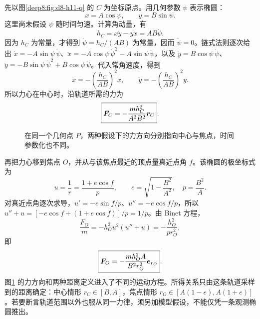 \begin{solution}
先以图\ref{deep8:fig:d8-h11-q} 的 $C$ 为坐标原点。用几何参数 $\psi$ 表示椭圆：
\[
 x=A\cos\psi,\qquad y=B\sin\psi.
\]
这里尚未假设 $\psi$ 随时间匀速。计算角动量，有
\[
 h_C=x\dot y-y\dot x=AB\dot\psi.
\]
因为 $h_C$ 为常量，才得到 $\dot\psi=h_C/(AB)$ 为常量，因而 $\ddot\psi=0$。链式法则逐次给出 $\dot x=-A\sin\psi\,\dot\psi$、$\ddot x=-A\cos\psi\,\dot\psi^2-A\sin\psi\,\ddot\psi$，以及 $\dot y=B\cos\psi\,\dot\psi$、$\ddot y=-B\sin\psi\,\dot\psi^2+B\cos\psi\,\ddot\psi$。代入常角速度，得到
\[
 \ddot x=-\left(\frac{h_C}{AB}\right)^2x,\qquad
 \ddot y=-\left(\frac{h_C}{AB}\right)^2y.
\]
所以力心在中心时，沿轨道所需的力为
\begin{equation}
 \boxed{\bm{F}_C=-\frac{mh_C^2}{A^2B^2}\bm{r}_C}.
\end{equation}
\begin{figure}[H]\centering
{}
\caption{在同一个几何点 $P$，两种假设下的力方向分别指向中心与焦点，时间参数化也不同。}\label{deep8:fig:d8-h11-s}
\end{figure}
再把力心移到焦点 $O$，并从与该焦点最近的顶点量真近点角 $f$。该椭圆的极坐标式为
\[
 u=\frac1r=\frac{1+e\cos f}{p},\qquad
 e=\sqrt{1-\frac{B^2}{A^2}},\quad p=\frac{B^2}A.
\]
对真近点角逐次求导，$u'=-e\sin f/p$、$u''=-e\cos f/p$，所以 $u''+u=[-e\cos f+(1+e\cos f)]/p=1/p$。由 Binet 方程，
\[
 \frac{F_O}m=-h_O^2u^2(u''+u)=-\frac{h_O^2}{pr_O^2},
\]
即
\begin{equation}
 \boxed{\bm{F}_O=-\frac{mh_O^2A}{B^2r_O^2}\bm{e}_{r_O}}.
\end{equation}
图\ref{deep8:fig:d8-h11-s} 的力方向和两种距离定义进入了不同的运动方程。所得关系只由这条轨道采样到的距离确定：中心情形 $r_C\in[B,A]$，焦点情形 $r_O\in[A(1-e),A(1+e)]$。若要断言轨道范围以外也服从同一力律，须另加模型假设，不能仅凭一条观测椭圆推出。
\end{solution}


